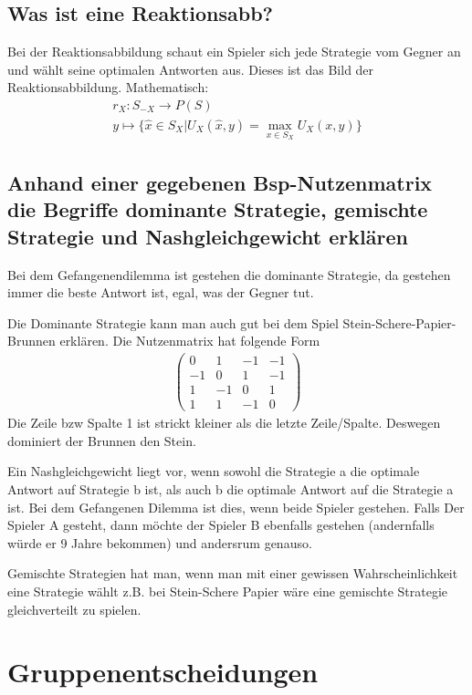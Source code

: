 \documentclass[]{article}
\begin{document}
\subsection*{Was ist eine Reaktionsabb? }
Bei der Reaktionsabbildung schaut ein Spieler sich jede Strategie vom Gegner an und wählt seine optimalen Antworten aus. Dieses ist das Bild der Reaktionsabbildung.
Mathematisch: 
\begin{align*}
	r_X:S_{-X} \rightarrow P(S) \\
	y \mapsto \{ \hat{ x }  \in S_X| U_X(\hat{x},y)= \max\limits_{x \in S_X} U_X(x,y) \} 
\end{align*}

\subsection*{Anhand einer gegebenen Bsp-Nutzenmatrix die Begriffe dominante Strategie, gemischte Strategie und Nashgleichgewicht erklären}

Bei dem Gefangenendilemma ist gestehen die dominante Strategie, da gestehen immer die beste Antwort ist, egal, was der Gegner tut.  

Die Dominante Strategie kann man auch gut bei dem Spiel Stein-Schere-Papier-Brunnen erklären. Die Nutzenmatrix hat folgende Form
\begin{align}
	\begin{pmatrix}
		0 & 1 & -1 & -1 \\
		-1 & 0 & 1 & -1 \\
		1 & -1 & 0 & 1 \\
		1 & 1 & -1 & 0 
	\end{pmatrix}
\end{align}
Die Zeile bzw Spalte 1 ist strickt kleiner als die letzte Zeile/Spalte. Deswegen dominiert der Brunnen den Stein. 

Ein Nashgleichgewicht liegt vor, wenn sowohl die Strategie a die optimale Antwort auf Strategie b ist, als auch b die optimale Antwort auf die Strategie a ist. Bei dem Gefangenen Dilemma ist dies, wenn beide Spieler gestehen. Falls Der Spieler A gesteht, dann möchte der Spieler B ebenfalls gestehen (andernfalls würde er 9 Jahre bekommen) und andersrum genauso. 

Gemischte Strategien hat man, wenn man mit einer gewissen Wahrscheinlichkeit eine Strategie wählt z.B. bei Stein-Schere Papier wäre eine gemischte Strategie gleichverteilt zu spielen. 

\section{Gruppenentscheidungen}
\end{document}

